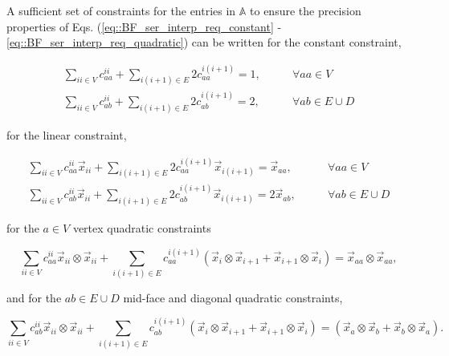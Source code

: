 A sufficient set of constraints for the entries in $\mathbb{A}$ to ensure the precision properties of Eqs. (\ref{eq::BF_ser_interp_req_constant} - \ref{eq::BF_ser_interp_req_quadratic}) can be written for the constant constraint,

\begin{equation}
\label{eq::BF_Amat_cons_constraints}
\begin{aligned}
\sum_{ii \in V} c_{aa}^{ii} + \sum_{i(i+1) \in E} 2 c_{aa}^{i(i+1)} = 1, &\qquad \forall aa \in V \\
\sum_{ii \in V} c_{ab}^{ii} + \sum_{i(i+1) \in E} 2 c_{ab}^{i(i+1)} = 2, &\qquad \forall ab \in E \cup D
\end{aligned}
\end{equation}

\noindent for the linear constraint,

\begin{equation}
\label{eq::BF_Amat_lin_constraints}
\begin{aligned}
\sum_{ii \in V} c_{aa}^{ii} \vec{x}_{ii} + \sum_{i(i+1) \in E} 2 c_{aa}^{i(i+1)} \vec{x}_{i(i+1)} = \vec{x}_{aa}, &\qquad \forall aa \in V \\
\sum_{ii \in V} c_{ab}^{ii} \vec{x}_{ii} + \sum_{i(i+1) \in E} 2 c_{ab}^{i(i+1)} \vec{x}_{i(i+1)} = 2 \vec{x}_{ab}, &\qquad \forall ab \in E \cup D
\end{aligned}
\end{equation}

\noindent for the $a\in V$ vertex quadratic constraints

\begin{equation}
\label{eq::BF_Amat_quad_vert_constraints}
\sum_{ii \in V} c_{aa}^{ii} \vec{x}_{ii} \otimes \vec{x}_{ii} + \sum_{i(i+1) \in E}  c_{aa}^{i(i+1)} \left( \vec{x}_i \otimes \vec{x}_{i+1} + \vec{x}_{i+1} \otimes \vec{x}_i \right) = \vec{x}_{aa} \otimes \vec{x}_{aa}, 
\end{equation}

\noindent and for the $ab \in E \cup D$ mid-face and diagonal quadratic constraints,

\begin{equation}
\label{eq::BF_Amat_quad_facediag_constraints}
\sum_{ii \in V} c_{ab}^{ii} \vec{x}_{ii} \otimes \vec{x}_{ii} + \sum_{i(i+1) \in E}  c_{ab}^{i(i+1)} \left( \vec{x}_i \otimes \vec{x}_{i+1} + \vec{x}_{i+1} \otimes \vec{x}_i \right) = \left( \vec{x}_a \otimes \vec{x}_{b} + \vec{x}_{b} \otimes \vec{x}_a \right).
\end{equation}

